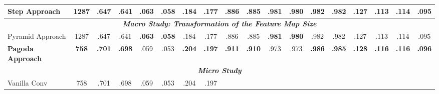 \begin{table}[htbp]
{\begin{tabular}{@{} p{1.2cm} p{0.5cm} p{0.55cm} p{0.55cm} p{0.55cm} p{0.55cm} p{0.55cm} p{0.55cm} p{0.55cm} p{0.55cm} p{0.55cm} p{0.55cm} p{0.55cm} p{0.55cm} p{0.52cm} p{0.52cm} p{0.52cm} p{0.52cm} @{}}
\multirow{1}{*}{\textbf{Step Approach}}
  & \multicolumn{1}{c}{\textbf{1287}}
  & \multicolumn{1}{c}{{\textbf{.647}}} 
  & \multicolumn{1}{c}{{\textbf{.641}}} 
  & \multicolumn{1}{c}{{.063}} 
  & \multicolumn{1}{c}{{\textbf{.058}}} 
  & \multicolumn{1}{c}{{.184}} 
  & \multicolumn{1}{c}{{.177}} 
  & \multicolumn{1}{c}{{\textbf{.886}}} 
  & \multicolumn{1}{c}{{\textbf{.885}}} 
  & \multicolumn{1}{c}{{\textbf{.981}}} 
  & \multicolumn{1}{c}{{\textbf{.980}}} 
  & \multicolumn{1}{c}{{\textbf{.982}}} 
  & \multicolumn{1}{c}{{\textbf{.982}}} 
  & \multicolumn{1}{c}{{\textbf{.127}}} 
  & \multicolumn{1}{c}{{\textbf{.113}}} 
  & \multicolumn{1}{c}{{.114}} 
  & \multicolumn{1}{c}{{\textbf{.095}}} \\ 
\midrule
\multicolumn{18}{c}{\textbf{\textit{Macro Study: Transformation of the Feature Map Size}}} \\
\midrule
\multirow{1}{*}{Pyramid Approach} 
  & \multicolumn{1}{c}{1287} 
  & \multicolumn{1}{c}{{.647}} 
  & \multicolumn{1}{c}{{.641}} 
  & \multicolumn{1}{c}{{\textbf{.063}}}
  & \multicolumn{1}{c}{{\textbf{.058}}}
  & \multicolumn{1}{c}{{.184}} 
  & \multicolumn{1}{c}{{.177}} 
  & \multicolumn{1}{c}{{.886}} 
  & \multicolumn{1}{c}{{.885}} 
  & \multicolumn{1}{c}{{\textbf{.981}}}
  & \multicolumn{1}{c}{{\textbf{.980}}}
  & \multicolumn{1}{c}{{.982}} 
  & \multicolumn{1}{c}{{.982}} 
  & \multicolumn{1}{c}{{.127}} 
  & \multicolumn{1}{c}{{.113}} 
  & \multicolumn{1}{c}{{.114}} 
  & \multicolumn{1}{c}{{.095}} \\ 
\multirow{1}{*}{\textbf{Pagoda Approach}}
  & \multicolumn{1}{c}{\textbf{758}}
  & \multicolumn{1}{c}{{\textbf{.701}}} 
  & \multicolumn{1}{c}{{\textbf{.698}}} 
  & \multicolumn{1}{c}{.059}
  & \multicolumn{1}{c}{.053}
  & \multicolumn{1}{c}{{\textbf{.204}}} 
  & \multicolumn{1}{c}{{\textbf{.197}}}
  & \multicolumn{1}{c}{{\textbf{.911}}}
  & \multicolumn{1}{c}{{\textbf{.910}}}  
  & \multicolumn{1}{c}{.973}
  & \multicolumn{1}{c}{.973}
  & \multicolumn{1}{c}{{\textbf{.986}}} 
  & \multicolumn{1}{c}{{\textbf{.985}}} 
  & \multicolumn{1}{c}{{\textbf{.128}}} 
  & \multicolumn{1}{c}{{\textbf{.116}}}
  & \multicolumn{1}{c}{{\textbf{.116}}} 
  & \multicolumn{1}{c}{{\textbf{.096}}} \\ 
\midrule
\multicolumn{18}{c}{\textbf{\textit{Micro Study}}} \\
\midrule
\multirow{1}{*}{Vanilla Conv} 
  & \multicolumn{1}{c}{758} 
  & \multicolumn{1}{c}{.701}
  & \multicolumn{1}{c}{.698}
  & \multicolumn{1}{c}{.059}
  & \multicolumn{1}{c}{.053}
  & \multicolumn{1}{c}{.204}
  & \multicolumn{1}{c}{.197}

\end{tabular}}
\end{table}
